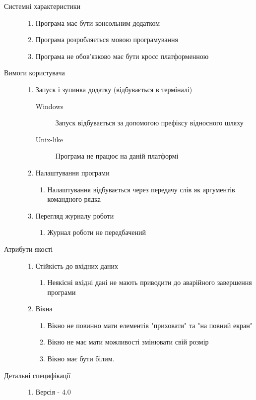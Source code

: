 \begin{description}
	\item[Системні характеристики]\directenv
		\begin{enumerate}
			\item Програма має бути консольним додатком
			\item Програма розробляється мовою програмування  
			\item Програма не обов'язково має бути кросс платформенною
		\end{enumerate}
	\item[Вимоги користувача]\directenv
		\begin{enumerate}
			\item Запуск і зупинка додатку (відбувається в терміналі)
				\begin{description}
					\item[Windows]
						Запуск відбувається за допомогою префіксу відносного шляху 
					\item[Unix-like]
						Програма не працює на даній платформі
				\end{description}
			\item Налаштування програми
				\begin{enumerate}
					\item Налаштування відбувається через передачу слів як аргументів командного рядка
				\end{enumerate}
			\item Перегляд журналу роботи
				\begin{enumerate}
					\item Журнал роботи не передбачений
				\end{enumerate}
		\end{enumerate}
	\item[Атрибути якості]\directenv
		\begin{enumerate}
			\item Стійкість до вхідних даних
				\begin{enumerate}
					\item Неякісні вхідні дані не мають приводити до аварійного завершення програми
				\end{enumerate}
			\item Вікна
				\begin{enumerate}
					\item Вікно не повинно мати елементів "приховати" та "на повний екран"
					\item Вікно не має мати можливості змінювати свій розмір
					\item Вікно має бути білим.
				\end{enumerate}
		\end{enumerate}
	\item[Детальні специфікації]\directenv
		\begin{enumerate}
			\item Версія  - 4.0
		\end{enumerate}
\end{description}


